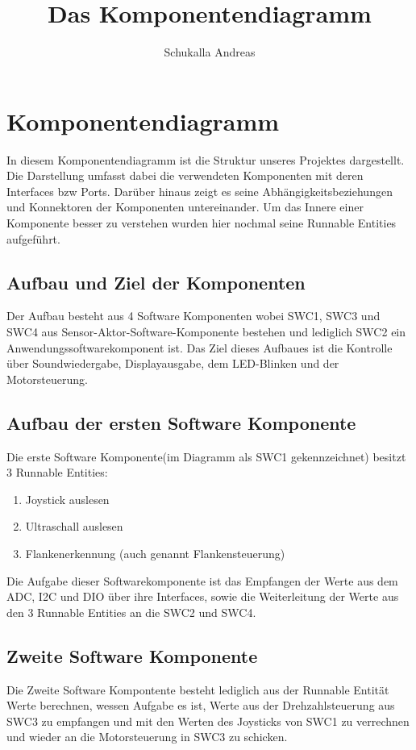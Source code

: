 \documentclass[12pt,a4paper]{article}
\title{Das Komponentendiagramm}
\author{Schukalla Andreas}
\begin{document}
\maketitle
\begin{landscape}

\end{landscape}


\section{Komponentendiagramm}
In diesem Komponentendiagramm ist die Struktur unseres Projektes dargestellt. Die Darstellung umfasst dabei die verwendeten Komponenten mit deren Interfaces bzw Ports. Darüber hinaus zeigt es seine Abhängigkeitsbeziehungen und Konnektoren der Komponenten untereinander. Um das Innere einer Komponente besser zu verstehen wurden hier nochmal seine Runnable Entities aufgeführt.

\subsection*{Aufbau und Ziel der Komponenten}
Der Aufbau besteht aus 4 Software Komponenten wobei SWC1, SWC3 und SWC4 aus Sensor-Aktor-Software-Komponente bestehen und lediglich SWC2 ein Anwendungssoftwarekomponent ist.
\newline
Das Ziel dieses Aufbaues ist die Kontrolle über Soundwiedergabe, Displayausgabe, dem LED-Blinken und der Motorsteuerung.

\subsection*{Aufbau der ersten Software Komponente}
Die erste Software Komponente(im Diagramm als SWC1 gekennzeichnet) besitzt 3 Runnable Entities:
\begin{enumerate}
\item Joystick auslesen
\item Ultraschall auslesen
\item Flankenerkennung (auch genannt Flankensteuerung)
\end{enumerate}
Die Aufgabe dieser Softwarekomponente ist das Empfangen der Werte aus dem ADC, I2C und DIO über ihre Interfaces, sowie die Weiterleitung der Werte aus den 3 Runnable Entities an die SWC2 und SWC4.

\subsection*{Zweite Software Komponente}
Die Zweite Software Kompontente besteht lediglich aus der Runnable Entität \dq Werte berechnen\dq, wessen Aufgabe es ist, Werte aus der Drehzahlsteuerung aus SWC3 zu empfangen und mit den Werten des Joysticks von SWC1 zu verrechnen und wieder an die Motorsteuerung in SWC3 zu schicken.
\end{document}
